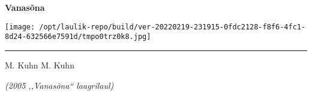 \documentclass[10pt]{book}
\begin{document}
{
  \samepage
  \raggedbottom
  \raggedright
  \sloppy


  \vspace{0.2in}
    \noindent\begin{minipage}{.1\textwidth}
      \hfill\vspace{0.1in}
    \end{minipage}%
    \noindent\begin{minipage}{.8\textwidth}
      \centering
      \bfseries
      \large Vanasõna
    \end{minipage}%
    \noindent\begin{minipage}{.1\textwidth}
      \texttt{[image: /opt/laulik-repo/build/ver-20220219-231915-0fdc2128-f8f6-4fc1-8d24-632566e7591d/tmpo0trz0k8.jpg]}
    \end{minipage}
  \nopagebreak[4]
  \vspace{0.1in}
  \nopagebreak[4]
  \hrule height 0.05ex
  \nopagebreak[4]
  \vspace{-0.05in}

  {\footnotesize M. Kuhn \hfill M. Kuhn }\\
  \vspace{0.01in}

  {\em {\footnotesize (2005 ,,Vanas\~ona{``} laagrilaul) } }
  \vspace{0.01in}

    \vspace{-0.05in}
  \nopagebreak[4]
  {%
\parindent 0pt
\noindent
\ifx\preLilyPondExample \undefined
\else
  \expandafter\preLilyPondExample
\fi
\def\lilypondbook{}%

\ifx\postLilyPondExample \undefined
\else
  \expandafter\postLilyPondExample
\fi
}
  \vspace{-0.1in}

}
\end{document}
